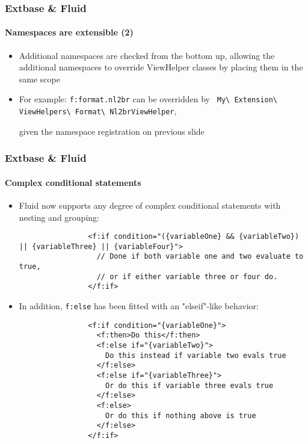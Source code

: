 \begin{frame}[fragile]
	\frametitle{Extbase \& Fluid}
	\framesubtitle{Namespaces are extensible (2)}

	\begin{itemize}

		\item Additional namespaces are checked from the bottom up, allowing the
			additional namespaces to override ViewHelper classes by placing them in
			the same scope

		\item For example: \texttt{f:format.nl2br} can be overridden by
			\texttt{
				My\textbackslash
				Extension\textbackslash
				ViewHelpers\textbackslash
				Format\textbackslash
				Nl2brViewHelper},

				given the namespace registration on previous slide

	\end{itemize}

\end{frame}



\begin{frame}[fragile]
	\frametitle{Extbase \& Fluid}
	\framesubtitle{Complex conditional statements}

	\lstset{basicstyle=\tiny\ttfamily}

	\begin{itemize}

		\item Fluid now supports any degree of complex conditional statements with
			nesting and grouping:

			\begin{lstlisting}
				<f:if condition="({variableOne} && {variableTwo}) || {variableThree} || {variableFour}">
				  // Done if both variable one and two evaluate to true,
				  // or if either variable three or four do.
				</f:if>
			\end{lstlisting}

		\item In addition, \texttt{f:else} has been fitted with an "elseif"-like behavior:

			\begin{lstlisting}
				<f:if condition="{variableOne}">
				  <f:then>Do this</f:then>
				  <f:else if="{variableTwo}">
				    Do this instead if variable two evals true
				  </f:else>
				  <f:else if="{variableThree}">
				    Or do this if variable three evals true
				  </f:else>
				  <f:else>
				    Or do this if nothing above is true
				  </f:else>
				</f:if>
			\end{lstlisting}

	\end{itemize}

\end{frame}


